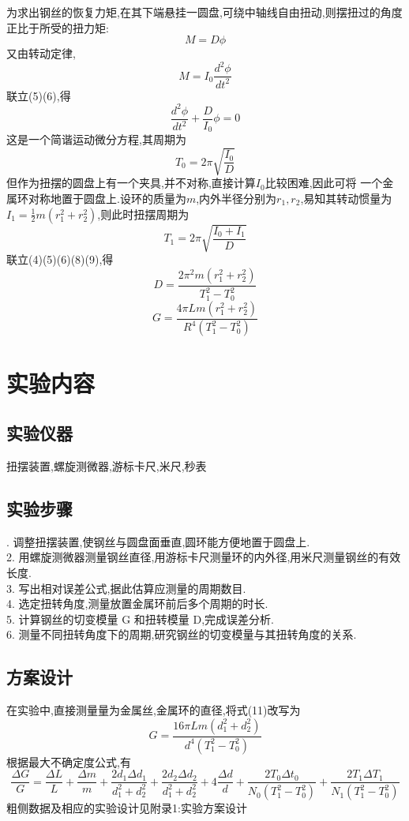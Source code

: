\documentclass[12pt,a4paper,oneside]{ctexart}
\begin{document}
为求出钢丝的恢复力矩,在其下端悬挂一圆盘,可绕中轴线自由扭动,则摆扭过的角度正比于所受的扭力矩:
\begin{equation}
    M=D\phi
\end{equation}
又由转动定律,
\begin{equation}
    M=I_0\dfrac{d^2\phi}{dt^2}
\end{equation}
联立(5)(6),得
\begin{equation}
    \dfrac{d^2\phi}{dt^2}+\dfrac{D}{I_0}\phi=0
\end{equation}
这是一个简谐运动微分方程,其周期为
\begin{equation}
    T_0=2\pi\sqrt{\dfrac{I_0}{D}}
\end{equation}
但作为扭摆的圆盘上有一个夹具,并不对称,直接计算$I_0$比较困难,因此可将
一个金属环对称地置于圆盘上.设环的质量为$m$,内外半径分别为$r_1,r_2$,易知其转动惯量为
$I_1=\frac{1}{2}m(r_1^2+r_2^2)$,则此时扭摆周期为
\begin{equation}
    T_1=2\pi\sqrt{\dfrac{I_0+I_1}{D}}
\end{equation}
联立(4)(5)(6)(8)(9),得
\begin{equation}
    D=\dfrac{2\pi^2m(r_1^2+r_2^2)}{T_1^2-T_0^2}
\end{equation}
\begin{equation}
    G=\dfrac{4\pi Lm(r_1^2+r_2^2)}{R^4(T_1^2-T_0^2)}
\end{equation}
\section{实验内容}
\subsection{实验仪器}
扭摆装置,螺旋测微器,游标卡尺,米尺,秒表
\subsection{实验步骤}. 调整扭摆装置,使钢丝与圆盘面垂直,圆环能方便地置于圆盘上.\\
2. 用螺旋测微器测量钢丝直径,用游标卡尺测量环的内外径,用米尺测量钢丝的有效长度.\\
3. 写出相对误差公式,据此估算应测量的周期数目.\\
4. 选定扭转角度,测量放置金属环前后多个周期的时长.\\
5. 计算钢丝的切变模量 G 和扭转模量 D,完成误差分析.\\
6. 测量不同扭转角度下的周期,研究钢丝的切变模量与其扭转角度的关系.
\subsection{方案设计}
在实验中,直接测量量为金属丝,金属环的直径,将式(11)改写为
\begin{equation}
    G=\dfrac{16\pi Lm(d_1^2+d_2^2)}{d^4(T_1^2-T_0^2)}
\end{equation}
根据最大不确定度公式,有
$$\dfrac{\Delta G}{G}=\dfrac{\Delta L}{L}+\dfrac{\Delta m}{m}
        +\dfrac{2d_1\Delta d_1}{d_1^2+d_2^2}+\dfrac{2d_2\Delta d_2}{d_1^2+d_2^2}
        +4\dfrac{\Delta d}{d}+\dfrac{2T_0\Delta t_0}{N_0(T_1^2-T_0^2)}+\dfrac{2T_1\Delta T_1}{N_1(T_1^2-T_0^2)}$$
粗侧数据及相应的实验设计见附录1:实验方案设计
\end{document}

